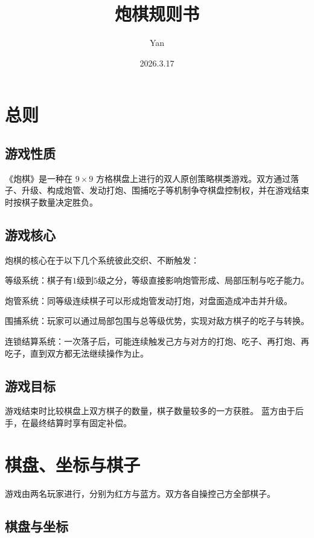 \documentclass[12pt]{ctexart}
\author{Yan}
\title{炮棋规则书}
\date{2026.3.17}
\begin{document}
\maketitle
\tableofcontents
\newpage

\section{总则}

\subsection{游戏性质}

《炮棋》是一种在 $9\times9$ 方格棋盘上进行的双人原创策略棋类游戏。双方通过落子、升级、构成炮管、发动打炮、围捕吃子等机制争夺棋盘控制权，并在游戏结束时按棋子数量决定胜负。

\subsection{游戏核心}

炮棋的核心在于以下几个系统彼此交织、不断触发：

等级系统：棋子有$1$级到$5$级之分，等级直接影响炮管形成、局部压制与吃子能力。

炮管系统：同等级连续棋子可以形成炮管发动打炮，对盘面造成冲击并升级。

围捕系统：玩家可以通过局部包围与总等级优势，实现对敌方棋子的吃子与转换。

连锁结算系统：一次落子后，可能连续触发己方与对方的打炮、吃子、再打炮、再吃子，直到双方都无法继续操作为止。

\subsection{游戏目标}

游戏结束时比较棋盘上双方棋子的数量，棋子数量较多的一方获胜。
蓝方由于后手，在最终结算时享有固定补偿。

\section{棋盘、坐标与棋子}

游戏由两名玩家进行，分别为红方与蓝方。双方各自操控己方全部棋子。

\subsection{棋盘与坐标}
\end{document}
